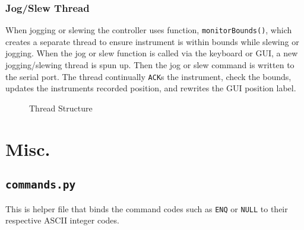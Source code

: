 \documentclass[11pt]{article}
\begin{document}
\subsubsection{Jog/Slew Thread}
When jogging or slewing the controller uses function, \texttt{monitorBounds()}, which creates a separate thread to ensure instrument is within bounds while slewing or jogging.  
When the jog or slew function is called via the keyboard or GUI, a new jogging/slewing thread is spun up. Then the jog or slew command is written to the serial port. The thread continually \texttt{ACK}s the instrument, check the bounds, updates the instruments recorded position, and rewrites the GUI position label.  

\begin{figure}[h]
    \centering
    \caption{Thread Structure}
\end{figure} 

\section{Misc.}
\subsection{\texttt{commands.py}}
This is helper file that binds the command codes such as \texttt{ENQ} or \texttt{NULL} to their respective ASCII integer codes.
\end{document}
